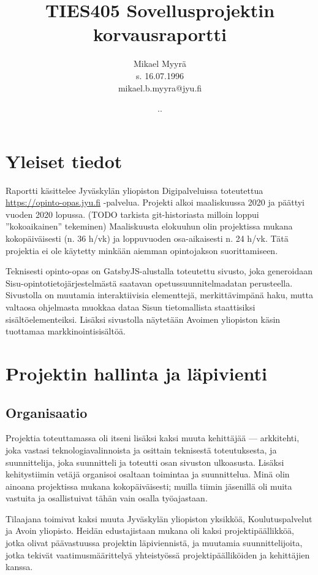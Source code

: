 \documentclass{article}
\title{TIES405 Sovellusprojektin korvausraportti}
\author{
Mikael Myyrä \\
s. 16.07.1996\\
mikael.b.myyra@jyu.fi\\
}
\date{\number\day.\number\month.\number\year}
\begin{document}
\maketitle

\section{Yleiset tiedot}

Raportti käsittelee Jyväskylän yliopiston Digipalveluissa toteutettua
\url{https://opinto-opas.jyu.fi} -palvelua.
Projekti alkoi maaliskuussa 2020 ja päättyi vuoden 2020 lopussa. (TODO tarkista git-historiasta milloin loppui ''kokoaikainen'' tekeminen)
Maaliskuusta elokuuhun olin projektissa mukana kokopäiväisesti (n. 36 h/vk) ja
loppuvuoden osa-aikaisesti n. 24 h/vk. Tätä projektia ei ole käytetty minkään
aiemman opintojakson suorittamiseen.

Teknisesti opinto-opas on GatsbyJS-alustalla toteutettu sivusto, joka
generoidaan Sisu-opintotieto\-järjestelmästä saatavan opetussuunnitelmadatan
perusteella. Sivustolla on muutamia interaktiivisia elementtejä,
merkittävimpänä haku, mutta valtaosa ohjelmasta muokkaa dataa Sisun
tieto\-mallista staattisiksi sisältöelementeiksi. Lisäksi sivustolla näytetään
Avoimen yliopiston käsin tuottamaa markkinointisisältöä.

\section{Projektin hallinta ja läpivienti}

\subsection{Organisaatio}

Projektia toteuttamassa oli itseni lisäksi kaksi muuta kehittäjää — arkkitehti,
joka vastasi teknologiavalinnoista ja osittain teknisestä toteutuksesta,
ja suunnittelija, joka suunnitteli ja toteutti osan sivuston ulkoasusta.
Lisäksi kehitystiimin vetäjä organisoi osaltaan toimintaa ja suunnittelua.
Minä olin ainoana projektissa mukana kokopäiväisesti; muilla tiimin jäsenillä
oli muita vastuita ja osallistuivat tähän vain osalla työajastaan.

Tilaajana toimivat kaksi muuta Jyväskylän yliopiston yksikköä,
Koulutuspalvelut ja Avoin yliopisto. Heidän edustajistaan mukana oli kaksi
projektipäällikköä, jotka olivat päävastuussa projektin läpiviennistä, ja
muutamia suunnittelijoita, jotka tekivät vaatimusmäärittelyä yhteistyössä
projektipäälliköiden ja kehittäjien kanssa.
\end{document}
